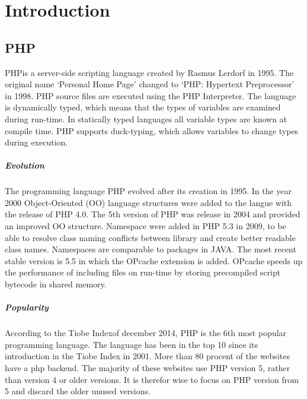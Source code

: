 \documentclass[../main.tex]{subfiles}
\begin{document}
    \chapter{Introduction}\label{chap:introduction}

    \section{PHP} %
        PHP\footnotemark is a server-side scripting language created by Rasmus Lerdorf in 1995.
        The original name `Personal Home Page' changed to `PHP: Hypertext Preprocessor' in 1998.
        PHP source files are executed using the PHP Interpreter. 
        The language is dynamically typed, which means that the types of variables are examined during run-time.
        In statically typed languages all variable types are known at compile time.
        PHP supports duck-typing, which allows variables to change types during execution.
        
        \paragraph{Evolution}
        The programming language PHP evolved after its creation in 1995.
        In the year 2000 Object-Oriented (OO) language structures were added to the langue with the release of PHP 4.0.
        The 5th version of PHP was release in 2004 and provided an improved OO structure.
        Namespace were added in PHP 5.3 in 2009, to be able to resolve class naming conflicts between library and create better readable class names.
        Namespaces are comparable to packages in JAVA.
        The most recent stable version is 5.5 in which the OPcache extension is added. 
        OPcache speeds up the performance of including files on run-time by storing precompiled script bytecode in shared memory.
       
        \paragraph{Popularity}
        According to the Tiobe Index\footnotemark of december 2014, PHP is the 6th most popular programming language.
        The language has been in the top 10 since its introduction in the Tiobe Index in 2001.
        More than 80 procent of the websites have a php backend\footnotemark.
        The majority of these websites use PHP version 5, rather than version 4 or older versions.
        It is therefor wise to focus on PHP version from 5 and discard the older unused versions.
            
\end{document}
